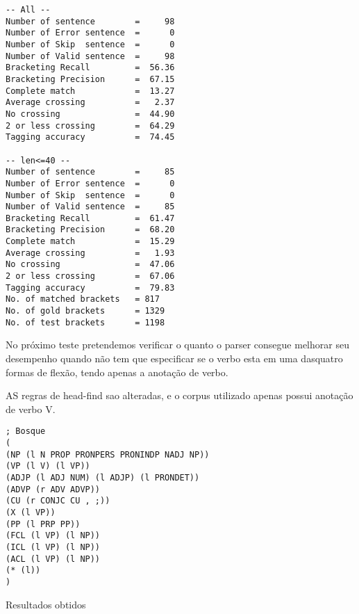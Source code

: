 \begin{verbatim}
-- All --
Number of sentence        =     98
Number of Error sentence  =      0
Number of Skip  sentence  =      0
Number of Valid sentence  =     98
Bracketing Recall         =  56.36
Bracketing Precision      =  67.15
Complete match            =  13.27
Average crossing          =   2.37
No crossing               =  44.90
2 or less crossing        =  64.29
Tagging accuracy          =  74.45

-- len<=40 --
Number of sentence        =     85
Number of Error sentence  =      0
Number of Skip  sentence  =      0
Number of Valid sentence  =     85
Bracketing Recall         =  61.47
Bracketing Precision      =  68.20
Complete match            =  15.29
Average crossing          =   1.93
No crossing               =  47.06
2 or less crossing        =  67.06
Tagging accuracy          =  79.83
No. of matched brackets   = 817
No. of gold brackets      = 1329
No. of test brackets      = 1198

\end{verbatim}

\normalsize

No próximo teste pretendemos verificar o quanto o parser consegue melhorar seu desempenho quando não tem que especificar se o verbo esta em uma dasquatro formas de flexão, tendo apenas a anotação de verbo.


AS regras de head-find sao alteradas, e o corpus utilizado apenas possui anotação de verbo V.

\scriptsize

\begin{verbatim}
; Bosque
(
(NP (l N PROP PRONPERS PRONINDP NADJ NP))
(VP (l V) (l VP))
(ADJP (l ADJ NUM) (l ADJP) (l PRONDET))
(ADVP (r ADV ADVP))
(CU (r CONJC CU , ;))
(X (l VP))
(PP (l PRP PP))
(FCL (l VP) (l NP))
(ICL (l VP) (l NP))
(ACL (l VP) (l NP))
(* (l))
)

\end{verbatim}

Resultados obtidos


